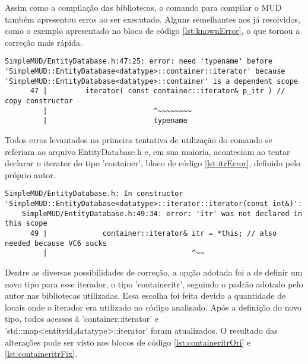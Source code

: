 Assim como a compilação das bibliotecas, o comando para compilar o MUD também apresentou 
erros ao ser executado. Alguns semelhantes aos já resolvidos, como o exemplo apresentado 
no bloco de código \ref{lst:knownError}, o que tornou a correção mais rápida.

\begin{lstlisting}[breaklines, label={lst:knownError}, caption={Exemplo de erro conhecido}]
    SimpleMUD/EntityDatabase.h:47:25: error: need 'typename' before 'SimpleMUD::EntityDatabase<datatype>::container::iterator' because 'SimpleMUD::EntityDatabase<datatype>::container' is a dependent scope
      47 |         iterator( const container::iterator& p_itr ) // copy constructor
         |                         ^~~~~~~~~
         |                         typename 
\end{lstlisting}

Todos erros levantados na primeira tentativa de utilização do comando se referiam ao arquivo
EntityDatabase.h e, em sua maioria, aconteciam ao tentar declarar o iterator do tipo 'container',
bloco de código \ref{lst:itrError}, definido pelo próprio autor.

\begin{lstlisting}[breaklines, label={lst:itrError}, caption={Exemplo de erro ao declarar iterador do tipo 'container'}]
    SimpleMUD/EntityDatabase.h: In constructor 'SimpleMUD::EntityDatabase<datatype>::iterator::iterator(const int&)':
    SimpleMUD/EntityDatabase.h:49:34: error: 'itr' was not declared in this scope
      49 |             container::iterator& itr = *this; // also needed because VC6 sucks
         |                                  ^~~
\end{lstlisting}

Dentre as diversas possibilidades de correção, a opção adotada foi a de definir um novo tipo para
esse iterador, o tipo 'containeritr', seguindo o padrão adotado pelo autor nas bibliotecas utilizadas.
Essa escolha foi feita devido a quantidade de locais onde o iterador era utilizado no código analisado.
Após a definição do novo tipo, todos acessos à 'container::iterator' e  
'std::map<entityid,datatype>::iterator' foram atualizados. O resultado das alterações pode ser visto nos
blocos de código \ref{lst:containeritrOri} e \ref{lst:containeritrFix}.

